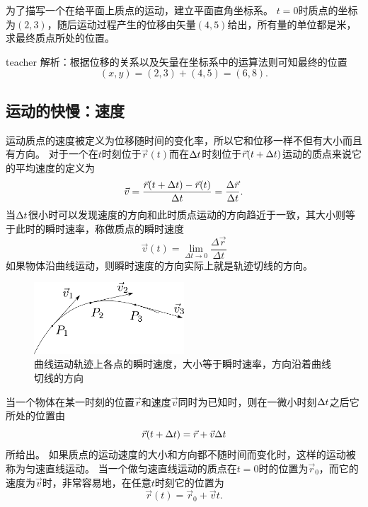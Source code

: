 \begin{example}
为了描写一个在给平面上质点的运动，建立平面直角坐标系。
$t=0$时质点的坐标为$(2,3)$，随后运动过程产生的位移由矢量$(4,5)$给出，所有量的单位都是米，求最终质点所处的位置。
\begin{taggedblock}{teacher}
\newline
解析：根据位移的关系以及矢量在坐标系中的运算法则可知最终的位置
\[(x,y) = (2,3)+(4,5) = (6,8).\]
\end{taggedblock}
\end{example}




\subsection{运动的快慢：速度}
运动质点的{\heiti 速度}被定义为位移随时间的变化率，所以它和位移一样不但有大小而且有方向。
对于一个在$t$时刻位于$\vec{r}(t)$而在$\Delta t$时刻位于$\vec{r}(t+\Delta t)$运动的质点来说它的平均速度的定义为
\begin{equation}
\vec{v} = \frac{\vec{r}(t+\Delta t)-\vec{r}(t)}{\Delta t}=\frac{\Delta \vec{r}}{\Delta t}.
\end{equation}
当$\Delta t$很小时可以发现速度的方向和此时质点运动的方向趋近于一致，其大小则等于此时的瞬时速率，称做质点的{\heiti 瞬时速度}
\begin{equation}
\vec{v}(t) = \lim_{\Delta t\rightarrow 0}\frac{\Delta \vec{r}}{\Delta t}
\end{equation}
如果物体沿曲线运动，则瞬时速度的方向实际上就是轨迹切线的方向。


\begin{figure}[hbtp]
\centering
\includegraphics[width=0.5\textwidth]{images/motion-theory-6.pdf}
\caption{曲线运动轨迹上各点的瞬时速度，大小等于瞬时速率，方向沿着曲线切线的方向}\label{fig: motion-曲线上各点的瞬时速度}
\end{figure}


当一个物体在某一时刻的位置$\vec{r}$和速度$\vec{v}$同时为已知时，则在一微小时刻$\Delta t$之后它所处的位置由
\begin{equation}
\vec{r}(t+\Delta t) = \vec{r}+\vec{v}\Delta t
\end{equation}
所给出。
如果质点的运动速度的大小和方向都不随时间而变化时，这样的运动被称为{\heiti 匀速直线运动}。
当一个做匀速直线运动的质点在$t=0$时的位置为$\vec{r}_0$，而它的速度为$\vec{v}$时，非常容易地，在任意$t$时刻它的位置为
\begin{equation}
\vec{r}(t) = \vec{r}_0+\vec{v}t.
\end{equation}





